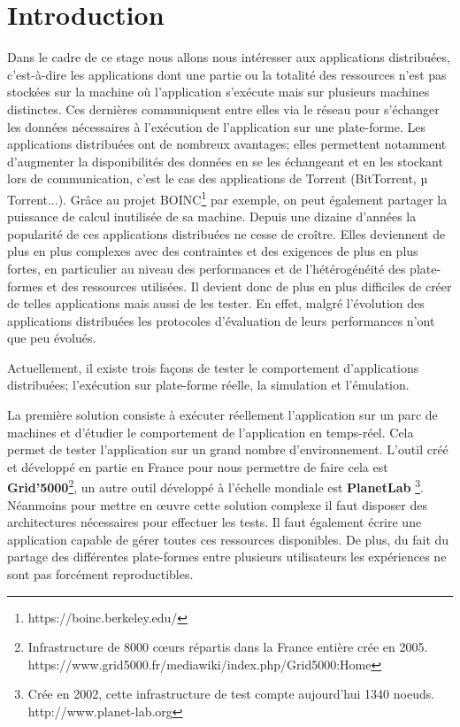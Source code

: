 \section{Introduction}



Dans le cadre de ce stage nous allons nous intéresser aux applications distribuées, c'est-à-dire les applications dont une partie ou la totalité des ressources  n'est pas stockées sur la machine où l'application s'exécute mais sur plusieurs machines distinctes. Ces dernières communiquent entre elles via le réseau pour s'échanger les données nécessaires à l'exécution de l'application sur une plate-forme. Les applications distribuées ont de nombreux avantages; elles permettent notamment d'augmenter la disponibilités des données en se les échangeant et en les stockant lors de communication, c'est le cas des applications de Torrent (BitTorrent, $µ$Torrent...). Grâce au projet BOINC\footnote{https://boinc.berkeley.edu/} par exemple, on peut également partager la puissance de calcul inutilisée de sa machine. Depuis une dizaine d'années la popularité de ces applications distribuées ne cesse de croître. Elles deviennent de plus en plus complexes avec des contraintes et des exigences de plus en plus fortes, en particulier au niveau des performances et de l'hétérogénéité des plate-formes et des ressources utilisées. Il devient donc de plus en plus difficiles de créer de telles applications mais aussi de les tester. En effet, malgré l'évolution des applications distribuées les protocoles d'évaluation de leurs performances n'ont que peu évolués.

Actuellement, il existe trois façons de tester le comportement d'applications distribuées; l'exécution sur plate-forme réelle, la simulation et l'émulation. 

La première solution consiste à exécuter réellement l'application sur un parc de machines et d'étudier le comportement de l'application en temps-réel. Cela permet de tester l'application sur un grand nombre d'environnement. L'outil créé et développé en partie en France pour nous permettre de faire cela est \textbf{Grid'5000}\footnote{Infrastructure de 8000 c\oe urs répartis dans la France entière crée en 2005. \\ https://www.grid5000.fr/mediawiki/index.php/Grid5000:Home}\cite{GRID5000}, un autre outil développé à l'échelle mondiale est \textbf{PlanetLab} \footnote{Crée en 2002, cette infrastructure de test compte aujourd'hui 1340 noeuds. \\ http://www.planet-lab.org}. Néanmoins pour mettre en \oe uvre cette solution complexe il faut disposer des architectures nécessaires pour effectuer les tests. Il faut également écrire une application capable de gérer toutes ces ressources disponibles. De plus, du fait du partage des différentes plate-formes entre plusieurs utilisateurs les expériences ne sont pas forcément reproductibles. 

